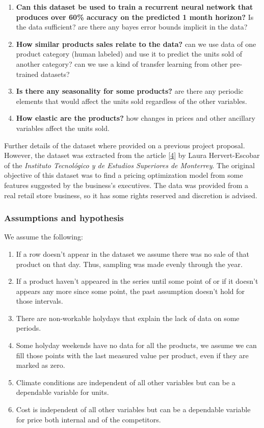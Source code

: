 \documentclass[]{article}
\providecommand{\tightlist}{%
  \setlength{\itemsep}{0pt}\setlength{\parskip}{0pt}}
\theoremstyle{definition}
\theoremstyle{definition}
\theoremstyle{definition}
\theoremstyle{remark}
\begin{document}
\begin{enumerate}
\def\labelenumi{\arabic{enumi}.}
\tightlist
\item
  \textbf{Can this dataset be used to train a recurrent neural network
  that produces over 60\% accuracy on the predicted 1 month horizon?} Is
  the data sufficient? are there any bayes error bounds implicit in the
  data?
\item
  \textbf{How similar products sales relate to the data?} can we use
  data of one product category (human labeled) and use it to predict the
  units sold of another category? can we use a kind of transfer learning
  from other pre-trained datasets?
\item
  \textbf{Is there any seasonality for some products?} are there any
  periodic elements that would affect the units sold regardless of the
  other variables.
\item
  \textbf{How elastic are the products?} how changes in prices and other
  ancillary variables affect the units sold.
\end{enumerate}

Further details of the dataset where provided on a previous project
proposal. However, the dataset was extracted from the article
{[}\protect\hyperlink{ref-Hervert-Escobar2017}{4}{]} by Laura
Hervert-Escobar of the \emph{Instituto Tecnológico y de Estudios
Superiores de Monterrey}. The original objective of this dataset was to
find a pricing optimization model from some features suggested by the
business's executives. The data was provided from a real retail store
business, so it has some rights reserved and discretion is advised.

\subsubsection{Assumptions and
hypothesis}\label{assumptions-and-hypothesis}

We assume the following:

\begin{enumerate}
\def\labelenumi{\arabic{enumi}.}
\tightlist
\item
  If a row doesn't appear in the dataset we assume there was no sale of
  that product on that day. Thus, sampling was made evenly through the
  year.
\item
  If a product haven't appeared in the series until some point of or if
  it doesn't appears any more since some point, the past assumption
  doesn't hold for those intervals.
\item
  There are non-workable holydays that explain the lack of data on some
  periods.
\item
  Some holyday weekends have no data for all the products, we assume we
  can fill those points with the last measured value per product, even
  if they are marked as zero.
\item
  Climate conditions are independent of all other variables but can be a
  dependable variable for units.
\item
  Cost is independent of all other variables but can be a dependable
  variable for price both internal and of the competitors.
\end{enumerate}
\end{document}
